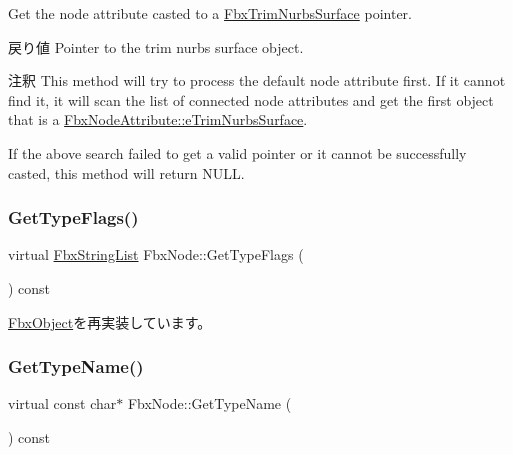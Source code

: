 Get the node attribute casted to a \hyperlink{class_fbx_trim_nurbs_surface}{Fbx\+Trim\+Nurbs\+Surface} pointer. \begin{DoxyReturn}{戻り値}
Pointer to the trim nurbs surface object. 
\end{DoxyReturn}
\begin{DoxyRemark}{注釈}
This method will try to process the default node attribute first. If it cannot find it, it will scan the list of connected node attributes and get the first object that is a \hyperlink{class_fbx_node_attribute_a08e1669d3d1a696910756ab17de56d6aae2ea2fbaa7dc68c851ba5cd32cada6e7}{Fbx\+Node\+Attribute\+::e\+Trim\+Nurbs\+Surface}. 

If the above search failed to get a valid pointer or it cannot be successfully casted, this method will return {\ttfamily N\+U\+LL}. 
\end{DoxyRemark}
\mbox{\label{class_fbx_node_a0356213c5c7afc57a03002db8b002af7}} 
\subsubsection{\texorpdfstring{Get\+Type\+Flags()}{GetTypeFlags()}}
{\footnotesize\ttfamily virtual \hyperlink{class_fbx_string_list}{Fbx\+String\+List} Fbx\+Node\+::\+Get\+Type\+Flags (\begin{DoxyParamCaption}{ }\end{DoxyParamCaption}) const\hspace{0.3cm}{\ttfamily [virtual]}}



\hyperlink{class_fbx_object_a6d30a5d00400039a248977cf9f9255b2}{Fbx\+Object}を再実装しています。

\mbox{\label{class_fbx_node_a802220645ef4d155755ebbf6f746a15c}} 
\subsubsection{\texorpdfstring{Get\+Type\+Name()}{GetTypeName()}}
{\footnotesize\ttfamily virtual const char$\ast$ Fbx\+Node\+::\+Get\+Type\+Name (\begin{DoxyParamCaption}{ }\end{DoxyParamCaption}) const\hspace{0.3cm}{\ttfamily [virtual]}}



